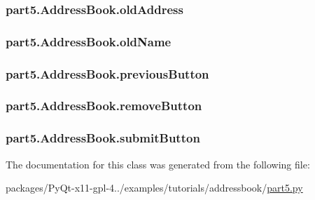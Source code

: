 \subsubsection[{old\+Address}]{\setlength{\rightskip}{0pt plus 5cm}part5.\+Address\+Book.\+old\+Address}\label{classpart5_1_1AddressBook_a4d69fb2a36878e8063efe1db8ec7fbc5}
\hypertarget{classpart5_1_1AddressBook_af56798127356065e4af0b51425f0e33e}{}
\subsubsection[{old\+Name}]{\setlength{\rightskip}{0pt plus 5cm}part5.\+Address\+Book.\+old\+Name}\label{classpart5_1_1AddressBook_af56798127356065e4af0b51425f0e33e}
\hypertarget{classpart5_1_1AddressBook_afd98d9acc031dd2885d7f79992ed968a}{}
\subsubsection[{previous\+Button}]{\setlength{\rightskip}{0pt plus 5cm}part5.\+Address\+Book.\+previous\+Button}\label{classpart5_1_1AddressBook_afd98d9acc031dd2885d7f79992ed968a}
\hypertarget{classpart5_1_1AddressBook_a0e3461b062bd23e1aac129b2de003a91}{}
\subsubsection[{remove\+Button}]{\setlength{\rightskip}{0pt plus 5cm}part5.\+Address\+Book.\+remove\+Button}\label{classpart5_1_1AddressBook_a0e3461b062bd23e1aac129b2de003a91}
\hypertarget{classpart5_1_1AddressBook_a1313615f7456f1113ce20ca668503166}{}
\subsubsection[{submit\+Button}]{\setlength{\rightskip}{0pt plus 5cm}part5.\+Address\+Book.\+submit\+Button}\label{classpart5_1_1AddressBook_a1313615f7456f1113ce20ca668503166}


The documentation for this class was generated from the following file\+:\begin{DoxyCompactItemize}
\item 
packages/\+Py\+Qt-\/x11-\/gpl-\/4../examples/tutorials/addressbook/\hyperlink{part5_8py}{part5.\+py}\end{DoxyCompactItemize}
